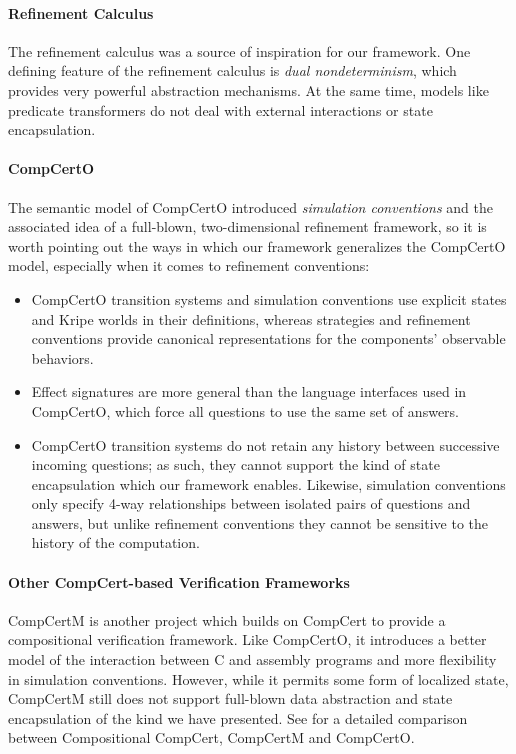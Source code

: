 \documentclass[acmsmall,screen,review,nonacm]{acmart}
\begin{document}
\paragraph{Refinement Calculus}

The refinement calculus \cite{refcal} was a source of inspiration for our framework.
One defining feature of the refinement calculus is \emph{dual nondeterminism},
which provides very powerful abstraction mechanisms.
At the same time, models like predicate transformers
do not deal with external interactions or state encapsulation.

\paragraph{CompCertO}

The semantic model of CompCertO introduced \emph{simulation conventions}
and the associated idea of a full-blown, two-dimensional refinement framework,
so it is worth pointing out the ways in which our framework generalizes the CompCertO model,
especially when it comes to refinement conventions:
\begin{itemize}
  \item CompCertO transition systems and simulation conventions use
    explicit states and Kripe worlds in their definitions,
    whereas strategies and refinement conventions provide canonical representations
    for the components' observable behaviors.
  \item
    Effect signatures are more general than the language interfaces used in CompCertO,
    which force all questions to use the same set of answers.
  \item
    CompCertO transition systems do not retain any history between successive incoming questions;
    as such, they cannot support the kind of state encapsulation which our framework enables.
    Likewise, simulation conventions only specify 4-way relationships
    between isolated pairs of questions and answers,
    but unlike refinement conventions they cannot be sensitive to the history of the computation.
\end{itemize}

\paragraph{Other CompCert-based Verification Frameworks} %

CompCertM \cite{compcertm} is another project
which builds on CompCert
to provide a compositional verification framework.
Like CompCertO,
it introduces a better model of the interaction between
C and assembly programs
and more flexibility in simulation conventions.
However, while it permits some form of localized state,
CompCertM still does not support
full-blown data abstraction and state encapsulation
of the kind we have presented.
See \citet{compcerto}
for a detailed comparison between Compositional CompCert,
CompCertM and CompCertO.
\end{document}
